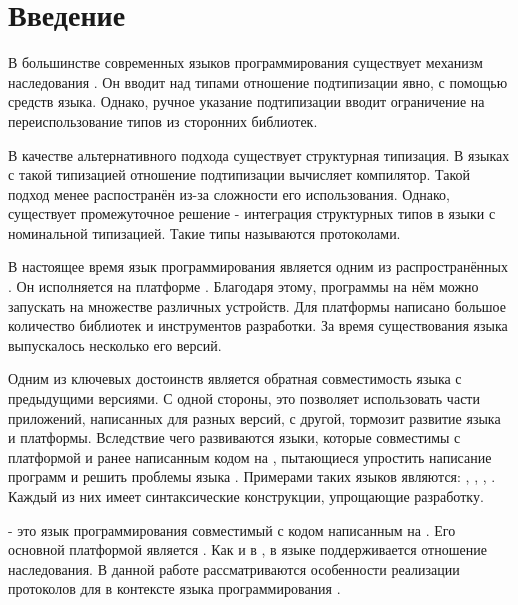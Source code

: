 \section*{Введение}

В большинстве современных языков программирования существует механизм наследования \cite{Cook:1989:IS:96709.96721}. Он вводит над типами отношение подтипизации явно, с помощью средств языка. Однако, ручное указание подтипизации вводит ограничение на переиспользование типов из сторонних библиотек.

В качестве альтернативного подхода существует структурная типизация\cite{book:pierce}. В языках с такой типизацией отношение подтипизации вычисляет компилятор. Такой подход менее распостранён из-за сложности его использования. Однако, существует промежуточное решение - интеграция структурных типов в языки с номинальной типизацией. Такие типы называются протоколами.

В настоящее время язык программирования  является одним из распространённых \cite{tiobe}. Он исполняется на платформе   . Благодаря этому, программы на нём можно запускать на множестве различных устройств. Для платформы написано большое количество библиотек и инструментов разработки. За время существования языка выпускалось несколько его версий.

Одним из ключевых достоинств  является обратная совместимость языка с предыдущими версиями\cite{openjdk:compatibility}. С одной стороны, это позволяет использовать части приложений, написанных для разных версий, с другой, тормозит развитие языка и платформы. Вследствие чего развиваются языки, которые совместимы с платформой  и ранее написанным кодом на , пытающиеся упростить написание программ и решить проблемы языка . Примерами таких языков являются: , , , . Каждый из них имеет синтаксические конструкции, упрощающие разработку.

 - это язык программирования совместимый с кодом написанным на . Его основной платформой является . Как и в , в языке  поддерживается отношение наследования. В данной работе рассматриваются особенности реализации протоколов для  в контексте языка программирования .
